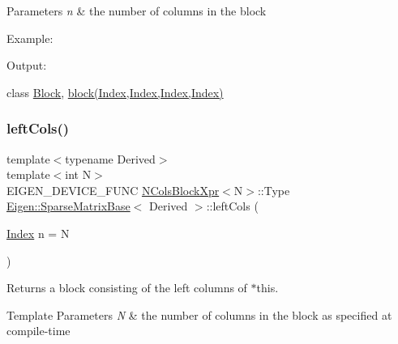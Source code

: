 \begin{DoxyParams}{Parameters}
{\em n} & the number of columns in the block\\
\hline
\end{DoxyParams}
Example\+: 
\begin{DoxyCodeInclude}{0}
\end{DoxyCodeInclude}
 Output\+: 
\begin{DoxyVerbInclude}
\end{DoxyVerbInclude}
 class \mbox{\hyperlink{class_eigen_1_1_block}{Block}}, \mbox{\hyperlink{class_eigen_1_1_sparse_matrix_base_a7c28a2f511181c727396d5e813519d38}{block(\+Index,\+Index,\+Index,\+Index)}} \mbox{\label{class_eigen_1_1_sparse_matrix_base_a4bff782eeab332b5e1d8210d86755be4}} 
\subsubsection{\texorpdfstring{leftCols()}{leftCols()}\hspace{0.1cm}{\footnotesize\ttfamily [2/2]}}
{\footnotesize\ttfamily template$<$typename Derived$>$ \\
template$<$int N$>$ \\
E\+I\+G\+E\+N\+\_\+\+D\+E\+V\+I\+C\+E\+\_\+\+F\+U\+NC \mbox{\hyperlink{struct_eigen_1_1_sparse_matrix_base_1_1_n_cols_block_xpr}{N\+Cols\+Block\+Xpr}}$<$N$>$\+::Type \mbox{\hyperlink{class_eigen_1_1_sparse_matrix_base}{Eigen\+::\+Sparse\+Matrix\+Base}}$<$ Derived $>$\+::left\+Cols (\begin{DoxyParamCaption}\item[{\mbox{\hyperlink{struct_eigen_1_1_eigen_base_a554f30542cc2316add4b1ea0a492ff02}{Index}}}]{n = {\ttfamily N} }\end{DoxyParamCaption})\hspace{0.3cm}{\ttfamily [inline]}}

\begin{DoxyReturn}{Returns}
a block consisting of the left columns of $\ast$this.
\end{DoxyReturn}

\begin{DoxyTemplParams}{Template Parameters}
{\em N} & the number of columns in the block as specified at compile-\/time \\
\hline
\end{DoxyTemplParams}

